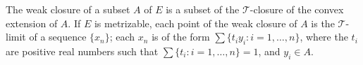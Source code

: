 The weak closure of a subset $A$ of $E$ is a subset of the $\mathcal{T}$-closure of the convex extension of $A$. If $E$ is metrizable, each point of the weak closure of $A$ is the $\mathcal{T}$-limit of a sequence $\{x_n\}$; each $x_n$ is of the form $\sum \{t_i y_i : i = 1, \dots, n\}$, where the $t_i$ are positive real numbers such that $\sum \{t_i : i = 1, \dots, n\} = 1$, and $y_i \in A$.
